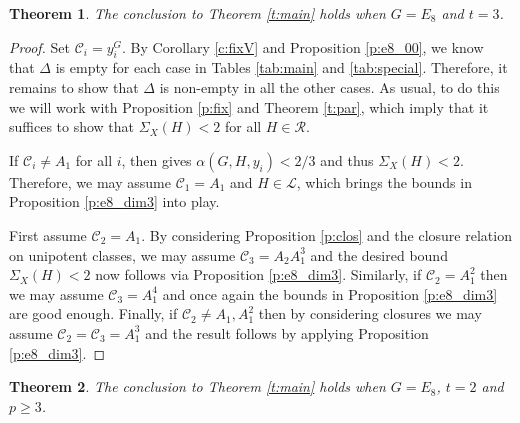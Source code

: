 \documentclass[twoside,a4paper,reqno,11pt]{amsart}
\renewcommand{\a}{\alpha}
\newcommand{\<}{\langle}
\renewcommand{\>}{\rangle}
\newcommand{\geqs}{\geqslant}
\renewcommand{\:}{\colon}
\theoremstyle{plain}
\newtheorem{thm}{Theorem}[section]
\theoremstyle{definition}
\begin{document}
\begin{thm}\label{t:e8_3}
The conclusion to Theorem \ref{t:main} holds when $G = E_8$ and $t=3$.
\end{thm}

\begin{proof}
Set $\mathcal{C}_i = y_i^G$. By Corollary \ref{c:fixV} and Proposition \ref{p:e8_00}, we know that  $\Delta$ is empty for each case in Tables \ref{tab:main} and \ref{tab:special}. Therefore, it remains to show that $\Delta$ is non-empty in all the other cases. As usual, to do this we will work with Proposition \ref{p:fix} and Theorem \ref{t:par}, which imply that it suffices to show that $\Sigma_X(H)<2$ for all $H \in \mathcal{R}$. 

If $\mathcal{C}_i \ne A_1$ for all $i$, then \cite[Theorem 3.1]{BGG1} gives $\a(G,H,y_i)<2/3$ and thus $\Sigma_X(H) <2$.  Therefore, we may assume $\mathcal{C}_1 = A_1$ and $H \in \mathcal{L}$, which brings the bounds in Proposition \ref{p:e8_dim3} into play.

First assume $\mathcal{C}_2 = A_1$. By considering Proposition \ref{p:clos} and the closure relation on unipotent classes, we may assume $\mathcal{C}_3 = A_2A_1^3$ and the desired bound $\Sigma_X(H)<2$ now follows via Proposition \ref{p:e8_dim3}. Similarly, if $\mathcal{C}_2 = A_1^2$ then we may assume $\mathcal{C}_3 = A_1^4$ and once again the bounds in Proposition \ref{p:e8_dim3} are good enough. Finally, if $\mathcal{C}_2 \ne A_1,A_1^2$ then by considering closures we may assume $\mathcal{C}_2 = \mathcal{C}_3 = A_1^3$ and the result follows by applying Proposition \ref{p:e8_dim3}. 
\end{proof}

\begin{thm}\label{t:e8_2}
The conclusion to Theorem \ref{t:main} holds when $G = E_8$, $t=2$ and $p \geqs 3$.
\end{thm}
\end{document}
